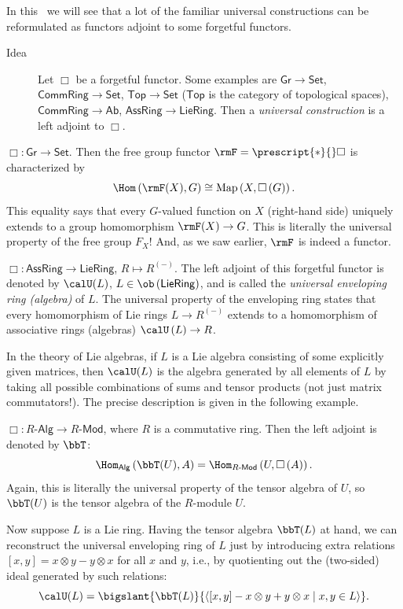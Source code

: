 In this \sect\ we will see that a lot of the familiar universal constructions
can be reformulated as functors adjoint to some forgetful functors. 
\begin{description}
\item [{Idea}] Let $\Box$ be a forgetful functor. Some examples are $\mathsf{Gr}\to\mathsf{Set}$,
$\mathsf{CommRing}\to\mathsf{Set}$, $\mathsf{Top}\to\mathsf{Set}$
($\mathsf{Top}$ is the category of topological spaces), $\mathsf{CommRing}\to\mathsf{Ab}$,
$\mathsf{AssRing}\to\mathsf{LieRing}$. Then a \emph{universal construction}
is a left adjoint to $\Box$.
\end{description}
\begin{example}
    $\Box:\mathsf{Gr}\to\mathsf{Set}$. Then the free group functor $\rmF=\prescript{\ast}{}\Box$ is characterized
    by 
    \[
    \Hom\left(\rmF(X),G\right)\cong\mathrm{Map}\left(X,\Box\left(G\right)\right).
    \]
    This equality says that every $G$-valued function on $X$ (right-hand
    side) uniquely extends to a group homomorphism $\rmF(X)\to G$. This
    is literally the universal property of the free group $F_{X}$! And, as we saw earlier, $\rmF$ is indeed a functor.
\end{example}
%
\begin{example}
    $\Box:\mathsf{AssRing}\to\mathsf{LieRing}$, $R\mapsto R^{(-)}$.
    The left adjoint of this forgetful functor is denoted by $\calU(L)$,
    $L\in\ob\left(\mathsf{LieRing}\right)$, and is called the \emph{universal
    enveloping ring (algebra)} of $L$. The universal property of the
    enveloping ring states that every homomorphism of Lie rings $L\to R^{(-)}$
    extends to a homomorphism of associative rings (algebras) $\calU\left(L\right)\to R$. 

    In the theory of Lie algebras, if $L$ is a Lie algebra consisting
    of some explicitly given matrices, then $\calU(L)$ is the algebra
    generated by all elements of $L$ by taking all possible combinations
    of sums and tensor products (not just matrix commutators!). The precise description is given in the following example.
\end{example}
%
\begin{example}
$\Box:R\text{-}\mathsf{Alg}\to R\text{-}\mathsf{Mod}$, where $R$
is a commutative ring. Then the left adjoint is denoted by $\bbT$:
\[
\Hom_{\mathsf{Alg}}\left(\bbT(U),A\right)=\Hom_{R\text{-}\mathsf{Mod}}\left(U,\Box\left(A\right)\right).
\]
Again, this is literally the universal property of the tensor algebra
of $U$, so $\bbT(U)$ is the tensor algebra of the $R$-module $U$.

Now suppose $L$ is a Lie ring. Having the tensor algebra $\bbT(L)$ at hand, we can reconstruct the
universal enveloping ring of $L$ just by introducing extra relations
$\left[x,y\right]=x\otimes y-y\otimes x$ for all $x$ and $y$, i.e., by quotienting out the (two-sided) ideal generated by such relations:
\[
\calU(L)=\bigslant{\bbT(L)}{\left\langle [x,y]-x\otimes y+y\otimes x\mid x,y\in L\right\rangle }.
\]
\end{example}
